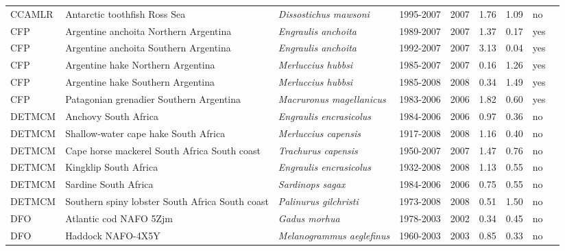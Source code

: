\begin{longtable}{p{1.8cm}p{4cm}p{4cm}ccccp{1.9cm}c}
  CCAMLR & Antarctic toothfish Ross Sea & \textit{Dissostichus mawsoni} & 1995-2007 & 2007 & 1.76 & 1.09 & no & \cite{CCAMLR-ATOOTHFISHRS-1995-2007-JENSEN} \\ 
  CFP & Argentine anchoita Northern Argentina & \textit{Engraulis anchoita} & 1989-2007 & 2007 & 1.37 & 0.17 & yes & \cite{INIDEP-ARGANCHONARG-1989-2007-Parma} \\ 
  CFP & Argentine anchoita Southern Argentina & \textit{Engraulis anchoita} & 1992-2007 & 2007 & 3.13 & 0.04 & yes & \cite{INIDEP-ARGANCHOSARG-1992-2007-Parma} \\ 
  CFP & Argentine hake Northern Argentina & \textit{Merluccius hubbsi} & 1985-2007 & 2007 & 0.16 & 1.26 & yes & \cite{INIDEP-ARGHAKENARG-1985-2007-Parma} \\ 
  CFP & Argentine hake Southern Argentina & \textit{Merluccius hubbsi} & 1985-2008 & 2008 & 0.34 & 1.49 & yes & \cite{INIDEP-ARGHAKESARG-1985-2008-Parma} \\ 
  CFP & Patagonian grenadier Southern Argentina & \textit{Macruronus magellanicus} & 1983-2006 & 2006 & 1.82 & 0.60 & yes & \cite{INIDEP-PATGRENADIERSARG-1983-2006-Parma} \\ 
  DETMCM & Anchovy South Africa & \textit{Engraulis encrasicolus} & 1984-2006 & 2006 & 0.97 & 0.36 & no & \cite{MARAM-ANCHOSA-1984-2006-deMoor} \\ 
  DETMCM & Shallow-water cape hake South Africa & \textit{Merluccius capensis} & 1917-2008 & 2008 & 1.16 & 0.40 & no & \cite{MARAM-CHAKESA-1917-2008-DEDECKER} \\ 
  DETMCM & Cape horse mackerel South Africa South coast & \textit{Trachurus capensis} & 1950-2007 & 2007 & 1.47 & 0.76 & no & \cite{MARAM-CTRACSA-1950-2007-Johnston} \\ 
  DETMCM & Kingklip South Africa & \textit{Engraulis encrasicolus} & 1932-2008 & 2008 & 1.13 & 0.55 & no & \cite{MARAM-KINGKLIPSA-1932-2008-DEDECKER} \\ 
  DETMCM & Sardine South Africa & \textit{Sardinops sagax} & 1984-2006 & 2006 & 0.75 & 0.55 & no & \cite{MARAM-SARDSA-1984-2006-deMoor} \\ 
  DETMCM & Southern spiny lobster South Africa South coast & \textit{Palinurus gilchristi} & 1973-2008 & 2008 & 0.51 & 1.50 & no & \cite{MARAM-SSLOBSTERSASC-1973-2008-Johnston} \\ 
  DFO & Atlantic cod NAFO 5Zjm & \textit{Gadus morhua} & 1978-2003 & 2002 & 0.34 & 0.45 & no & \cite{DFO-COD5Zjm-1978-2003-PREFONTAINE} \\ 
  DFO & Haddock NAFO-4X5Y & \textit{Melanogrammus aeglefinus} & 1960-2003 & 2003 & 0.85 & 0.33 & no & \cite{DFO-HAD4X5Y-1960-2003-PREFONTAINE} \\ 

\end{longtable}
